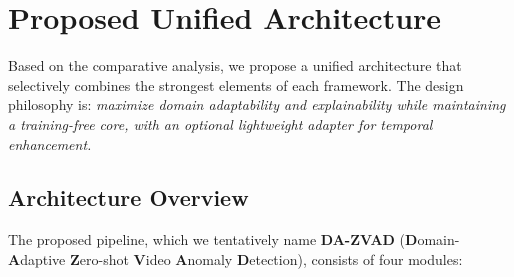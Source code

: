 \documentclass[12pt, a4paper]{article}
\begin{document}
\section{Proposed Unified Architecture}

Based on the comparative analysis, we propose a unified architecture that selectively combines the strongest elements of each framework. The design philosophy is: \textit{maximize domain adaptability and explainability while maintaining a training-free core, with an optional lightweight adapter for temporal enhancement.}

\subsection{Architecture Overview}

The proposed pipeline, which we tentatively name \textbf{DA-ZVAD} (\textbf{D}omain-\textbf{A}daptive \textbf{Z}ero-shot \textbf{V}ideo \textbf{A}nomaly \textbf{D}etection), consists of four modules:
\end{document}
